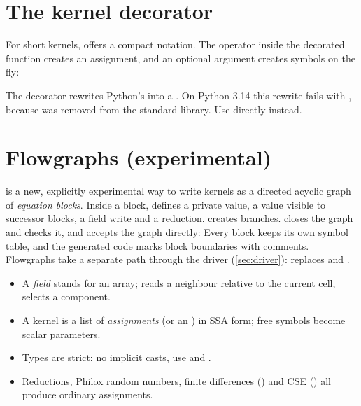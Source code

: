 \section{The kernel decorator}

For short kernels,  offers a compact notation. The operator 
inside the decorated function creates an assignment, and an optional argument
 creates symbols on the fly:

\begin{pitfall}
  The decorator rewrites Python's  into a . On
  Python 3.14 this rewrite fails with , because  was removed from the
  standard library. Use  directly instead.
\end{pitfall}

\section{Flowgraphs (experimental)}\label{sec:flow}

 is a new, explicitly experimental way to write kernels as a directed
acyclic graph of \emph{equation blocks}. Inside a block, 
defines a private value,  a value visible to successor
blocks,  a field write and 
a reduction.  creates branches.  closes the graph
and checks it, and  accepts the graph directly:
Every block keeps its own symbol table, and the generated code marks block boundaries
with comments. Flowgraphs take a separate path through the driver
(\cref{sec:driver}):  replaces  and
.

\begin{keyidea}[Summary]
  \begin{itemize}[leftmargin=1.2em]
    \item A \emph{field} stands for an array;  reads a neighbour relative
          to the current cell,  selects a component.
    \item A kernel is a list of \emph{assignments} (or an ) in
          SSA form; free symbols become scalar parameters.
    \item Types are strict: no implicit casts, use  and .
    \item Reductions, Philox random numbers, finite differences () and CSE
          () all produce ordinary assignments.
  \end{itemize}
\end{keyidea}
